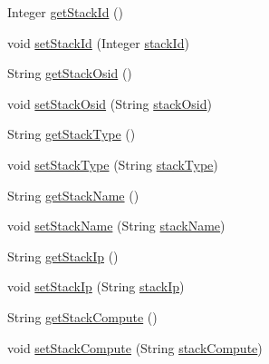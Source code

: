 \begin{DoxyCompactItemize}
\item 
Integer \mbox{\hyperlink{classcom_1_1example_1_1demo_1_1modular_1_1_stack_aeeecb911a3a913f955d86ef44f678050}{get\+Stack\+Id}} ()
\item 
void \mbox{\hyperlink{classcom_1_1example_1_1demo_1_1modular_1_1_stack_acb7d1dcbb13be8d6d79db839f9b31e00}{set\+Stack\+Id}} (Integer \mbox{\hyperlink{classcom_1_1example_1_1demo_1_1modular_1_1_stack_a39181f285b8fb046b291930dbd9b407b}{stack\+Id}})
\item 
String \mbox{\hyperlink{classcom_1_1example_1_1demo_1_1modular_1_1_stack_abdb14dc4082393d95f050f29a9e10f6d}{get\+Stack\+Osid}} ()
\item 
void \mbox{\hyperlink{classcom_1_1example_1_1demo_1_1modular_1_1_stack_a6b83dc95905fc21ca45e7ee4da2c5028}{set\+Stack\+Osid}} (String \mbox{\hyperlink{classcom_1_1example_1_1demo_1_1modular_1_1_stack_aa8fd54c63bd8fbeef9689ed0790a0a2a}{stack\+Osid}})
\item 
String \mbox{\hyperlink{classcom_1_1example_1_1demo_1_1modular_1_1_stack_a8b34130843d8a8a2cd85226307c04cd9}{get\+Stack\+Type}} ()
\item 
void \mbox{\hyperlink{classcom_1_1example_1_1demo_1_1modular_1_1_stack_a9b01499f4bf029eefd29c18cb5668c7d}{set\+Stack\+Type}} (String \mbox{\hyperlink{classcom_1_1example_1_1demo_1_1modular_1_1_stack_a0c655d23ddd865937a884dabf0190f3e}{stack\+Type}})
\item 
String \mbox{\hyperlink{classcom_1_1example_1_1demo_1_1modular_1_1_stack_a746015f8c93a52a4bd09a5ba080ca269}{get\+Stack\+Name}} ()
\item 
void \mbox{\hyperlink{classcom_1_1example_1_1demo_1_1modular_1_1_stack_a0af1fa304d5637c8240524cf62b49a99}{set\+Stack\+Name}} (String \mbox{\hyperlink{classcom_1_1example_1_1demo_1_1modular_1_1_stack_ae5759a731886729bcf087959692f1542}{stack\+Name}})
\item 
String \mbox{\hyperlink{classcom_1_1example_1_1demo_1_1modular_1_1_stack_a984fece18aba7b848607189cf7a429a2}{get\+Stack\+Ip}} ()
\item 
void \mbox{\hyperlink{classcom_1_1example_1_1demo_1_1modular_1_1_stack_a216797fd4a8e6015a18b1f358725b740}{set\+Stack\+Ip}} (String \mbox{\hyperlink{classcom_1_1example_1_1demo_1_1modular_1_1_stack_ae0bbcc492595b5920765995bfe148e69}{stack\+Ip}})
\item 
String \mbox{\hyperlink{classcom_1_1example_1_1demo_1_1modular_1_1_stack_aace8430a5968853751404a10efeda32a}{get\+Stack\+Compute}} ()
\item 
void \mbox{\hyperlink{classcom_1_1example_1_1demo_1_1modular_1_1_stack_a3d89dd0aed6c4d1f30edcb53f803f9ec}{set\+Stack\+Compute}} (String \mbox{\hyperlink{classcom_1_1example_1_1demo_1_1modular_1_1_stack_afaed809049fbbe917b1cd5ea2e12eb71}{stack\+Compute}})

\end{DoxyCompactItemize}
